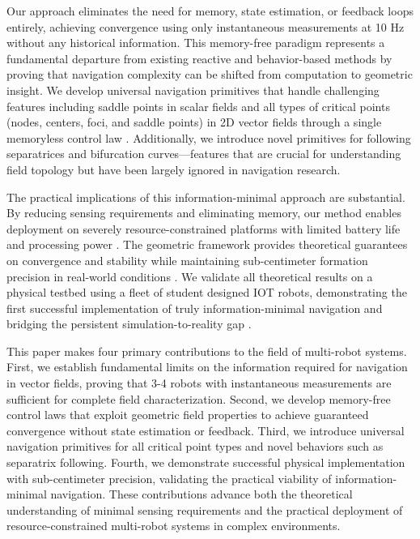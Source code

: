\documentclass{article}
\begin{document}
Our approach eliminates the need for memory, state estimation, or feedback loops entirely, achieving convergence using only instantaneous measurements at 10 Hz without any historical information. This memory-free paradigm represents a fundamental departure from existing reactive and behavior-based methods  by proving that navigation complexity can be shifted from computation to geometric insight. We develop universal navigation primitives that handle challenging features including saddle points in scalar fields and all types of critical points (nodes, centers, foci, and saddle points) in 2D vector fields through a single memoryless control law . Additionally, we introduce novel primitives for following separatrices and bifurcation curves—features that are crucial for understanding field topology but have been largely ignored in navigation research.

The practical implications of this information-minimal approach are substantial. By reducing sensing requirements and eliminating memory, our method enables deployment on severely resource-constrained platforms with limited battery life and processing power . The geometric framework provides theoretical guarantees on convergence and stability while maintaining sub-centimeter formation precision in real-world conditions . We validate all theoretical results on a physical testbed using a fleet of student designed IOT robots, demonstrating the first successful implementation of truly information-minimal navigation and bridging the persistent simulation-to-reality gap .

This paper makes four primary contributions to the field of multi-robot systems. First, we establish fundamental limits on the information required for navigation in vector fields, proving that 3-4 robots with instantaneous measurements are sufficient for complete field characterization. Second, we develop memory-free control laws that exploit geometric field properties to achieve guaranteed convergence without state estimation or feedback. Third, we introduce universal navigation primitives for all critical point types and novel behaviors such as separatrix following. Fourth, we demonstrate successful physical implementation with sub-centimeter precision, validating the practical viability of information-minimal navigation. These contributions advance both the theoretical understanding of minimal sensing requirements and the practical deployment of resource-constrained multi-robot systems in complex environments.
\end{document}
